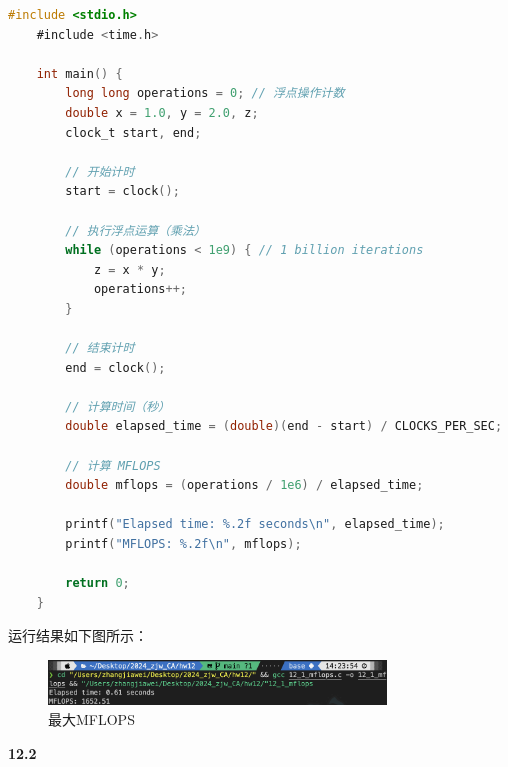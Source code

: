 \documentclass[UTF8]{report}
\begin{document}
\begin{lstlisting}[language=C]
    #include <stdio.h>
    #include <time.h>
    
    int main() {
        long long operations = 0; // 浮点操作计数
        double x = 1.0, y = 2.0, z;
        clock_t start, end;
    
        // 开始计时
        start = clock();
    
        // 执行浮点运算（乘法）
        while (operations < 1e9) { // 1 billion iterations
            z = x * y;
            operations++;
        }
    
        // 结束计时
        end = clock();
    
        // 计算时间（秒）
        double elapsed_time = (double)(end - start) / CLOCKS_PER_SEC;
    
        // 计算 MFLOPS
        double mflops = (operations / 1e6) / elapsed_time;
    
        printf("Elapsed time: %.2f seconds\n", elapsed_time);
        printf("MFLOPS: %.2f\n", mflops);
    
        return 0;
    }
\end{lstlisting}

运行结果如下图所示：

\begin{figure}[H]
    \centering
    \includegraphics[width=0.8\textwidth]{img/maxMFLOPS.png}
    \caption{最大MFLOPS}
\end{figure}

\noindent
\textbf{12.2}
\end{document}
